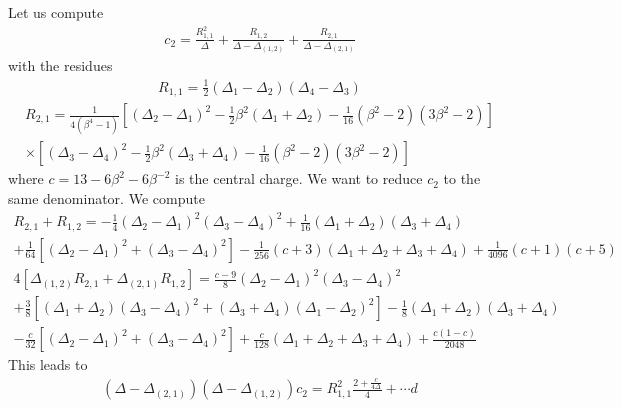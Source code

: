 \documentclass[12pt,a4paper]{article}
\begin{document}
Let us compute 
\begin{align}
 c_2 = \frac{R_{1,1}^2}{\Delta} +\frac{R_{1,2}}{\Delta-\Delta_{(1,2)}} + \frac{R_{2,1}}{\Delta-\Delta_{(2,1)}}
\end{align}
with the residues 
\begin{align}
 R_{1,1} = \tfrac12 (\Delta_1-\Delta_2)(\Delta_4-\Delta_3) 
 \end{align}
 \begin{multline}
   R_{2,1} = \frac{1}{4(\beta^4-1)}\left[(\Delta_2-\Delta_1)^2 -\tfrac12 \beta^2(\Delta_1+\Delta_2) -\tfrac{1}{16}(\beta^2-2)(3\beta^2-2)\right] 
   \\
\times \left[(\Delta_3-\Delta_4)^2 -\tfrac12 \beta^2(\Delta_3+\Delta_4) -\tfrac{1}{16}(\beta^2-2)(3\beta^2-2)\right] 
 \end{multline}
 where $c=13-6\beta^2-6\beta^{-2}$ is the central charge. 
We want to reduce $c_2$ to the same denominator. We compute 
\begin{multline}
 R_{2,1}+R_{1,2} = -\frac14 (\Delta_2-\Delta_1)^2(\Delta_3-\Delta_4)^2 +\frac{1}{16}(\Delta_1+\Delta_2)(\Delta_3+\Delta_4) 
 \\
 +\frac{1}{64} \left[(\Delta_2-\Delta_1)^2+(\Delta_3-\Delta_4)^2\right] -\frac{1}{256}(c+3)(\Delta_1+\Delta_2+\Delta_3+\Delta_4) + \frac{1}{4096}(c+1)(c+5)
\end{multline}
\begin{multline}
 4\left[\Delta_{(1,2)}R_{2,1}+\Delta_{(2,1)}R_{1,2}\right] = \frac{c-9}{8} (\Delta_2-\Delta_1)^2(\Delta_3-\Delta_4)^2 
 \\
 +\frac38 \left[(\Delta_1+\Delta_2)(\Delta_3-\Delta_4)^2+(\Delta_3+\Delta_4)(\Delta_1-\Delta_2)^2\right] 
 -\frac18(\Delta_1+\Delta_2)(\Delta_3+\Delta_4) 
 \\
 -\frac{c}{32}\left[(\Delta_2-\Delta_1)^2+(\Delta_3-\Delta_4)^2\right] +\frac{c}{128}(\Delta_1+\Delta_2+\Delta_3+\Delta_4) + \frac{c(1-c)}{2048}
\end{multline}
This leads to 
\begin{multline}
 (\Delta-\Delta_{(2,1)})(\Delta-\Delta_{(1,2)}) c_2 = R_{1,1}^2\frac{2+\frac{c}{4\Delta}}{4} + \cdots d \\
\end{multline}








\end{document}
